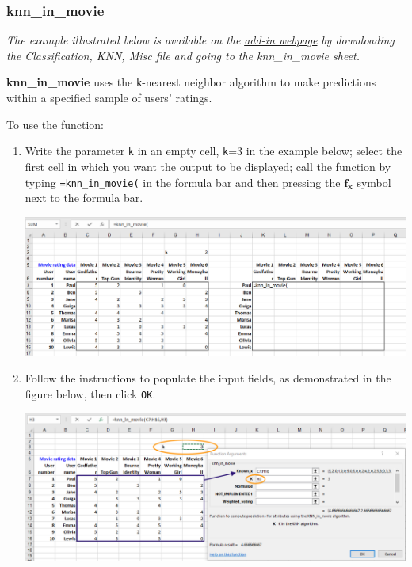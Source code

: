 \documentclass[12pt]{article}
\begin{document}
\subsubsection{knn\_in\_movie}

\textit{The example illustrated below is available on the}  \href{https://www8.gsb.columbia.edu/bizanalytics/excel-add-in/multiplatform#h-4}{ \textit{add-in webpage}}
 \textit{by downloading the Classification, KNN, Misc file and going to the knn\_in\_movie sheet.}
 
\textbf{knn\_in\_movie} uses the \texttt{k}-nearest neighbor algorithm to make predictions within a specified sample of users' ratings.

To use the function:
\begin{enumerate}
\item Write the parameter \texttt{k} in an empty cell, \texttt{k}=3 in the example below; select the first cell in which you want the output to be displayed; call the function by typing \texttt{=knn\_in\_movie(} in the formula bar and then pressing the $\boldsymbol{f_x}$ symbol next to the formula bar.

\medskip

\centerline{\includegraphics[width=5.5in]{figures/knninmovie1}}

\medskip

\item Follow the instructions to populate the input fields, as demonstrated in the figure below, then click \texttt{OK}.

\medskip

\centerline{\includegraphics[width=5.5in]{figures/knninmovie2}}


\end{enumerate}
\end{document}
